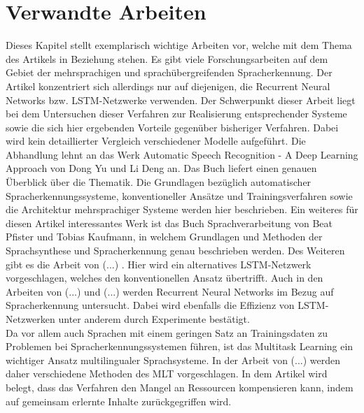\section{Verwandte Arbeiten}
Dieses Kapitel stellt exemplarisch wichtige Arbeiten vor, welche mit dem Thema des Artikels in Beziehung stehen. Es gibt viele Forschungsarbeiten auf dem Gebiet der mehrsprachigen und sprachübergreifenden Spracherkennung. Der Artikel konzentriert sich allerdings nur auf diejenigen, die Recurrent Neural Networks bzw. LSTM-Netzwerke verwenden. Der Schwerpunkt dieser Arbeit liegt bei dem Untersuchen dieser Verfahren zur Realisierung entsprechender Systeme sowie die sich hier ergebenden Vorteile gegenüber bisheriger Verfahren. Dabei wird kein detaillierter Vergleich verschiedener Modelle aufgeführt.  
Die Abhandlung lehnt an das Werk Automatic Speech Recognition - A Deep Learning Approach von Dong Yu und Li Deng \cite{Yu.2014} an. Das Buch liefert einen genauen Überblick über die Thematik. Die Grundlagen bezüglich automatischer Spracherkennungssysteme, konventioneller Ansätze und Trainingsverfahren sowie die Architektur mehrsprachiger Systeme werden hier beschrieben.
Ein weiteres für diesen Artikel interessantes Werk ist das Buch Sprachverarbeitung von Beat Pfister und Tobias Kaufmann, in welchem Grundlagen und Methoden der Sprachsynthese und Spracherkennung genau beschrieben werden.  
Des Weiteren gibt es die Arbeit von (...) {\cite{2017arXiv170307090T}}. Hier wird ein alternatives LSTM-Netzwerk vorgeschlagen, welches den konventionellen Ansatz übertrifft. Auch in den Arbeiten von (...) {\cite{6638947}} und (...) {\cite{2014arXiv1402}} werden Recurrent Neural Networks im Bezug auf Spracherkennung untersucht. Dabei wird ebenfalls die Effizienz von LSTM-Netzwerken unter anderem durch Experimente bestätigt. \\Da vor allem auch Sprachen mit einem geringen Satz an Trainingsdaten zu Problemen bei Spracherkennungssystemen führen, ist das Multitask Learning ein wichtiger Ansatz multilingualer Sprachsysteme. In der Arbeit von (...) werden daher verschiedene Methoden des MLT vorgeschlagen. In dem Artikel wird belegt, dass das Verfahren den Mangel an Ressourcen kompensieren kann, indem auf gemeinsam erlernte Inhalte zurückgegriffen wird.



